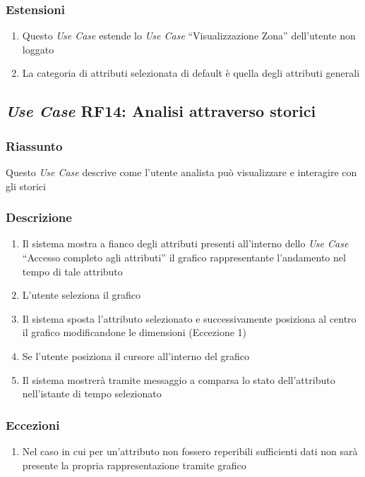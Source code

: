         \subsubsection{Estensioni}
            \begin{enumerate}
                \item Questo \textit{Use Case} estende lo \textit{Use Case} ``Visualizzazione Zona'' dell'utente non loggato
                \item La categoria di attributi selezionata di default è quella degli attributi generali
            \end{enumerate}

    \subsection{\textit{Use Case} RF14: Analisi attraverso storici}
        \subsubsection{Riassunto}
            Questo \textit{Use Case} descrive come l'utente analista può visualizzare e interagire con gli storici
        \subsubsection{Descrizione}
            \begin{enumerate}
                \item Il sistema mostra a fianco degli attributi presenti all'interno dello \textit{Use Case} ``Accesso completo agli attributi'' il grafico rappresentante l'andamento nel tempo di tale attributo
                \item L'utente seleziona il grafico
                \item Il sistema sposta l'attributo selezionato e successivamente posiziona al centro il grafico modificandone le dimensioni (Eccezione 1)
                \item Se l'utente posiziona il cursore all'interno del grafico
                \item Il sistema mostrerà tramite messaggio a comparsa lo stato dell'attributo nell'istante di tempo selezionato
            \end{enumerate}
        \subsubsection{Eccezioni}
            \begin{enumerate}
                \item Nel caso in cui per un'attributo non fossero reperibili sufficienti dati non sarà presente la propria rappresentazione tramite grafico
            \end{enumerate}


